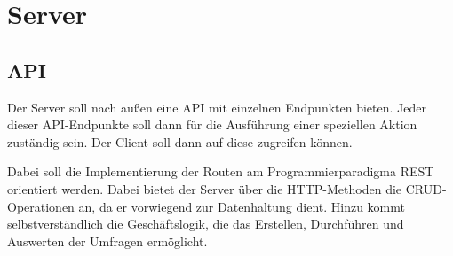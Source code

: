 \section{Server}


\subsection{\acl{API}}
Der Server soll nach außen eine \acs{API} mit einzelnen Endpunkten bieten.
Jeder dieser \acs{API}-Endpunkte soll dann für die Ausführung einer speziellen Aktion zuständig sein.
Der Client soll dann auf diese zugreifen können.

Dabei soll die Implementierung der Routen am Programmierparadigma \acs{REST} orientiert werden.
Dabei bietet der Server über die \acs{HTTP}-Methoden die \acs{CRUD}-Operationen an, da er vorwiegend zur Datenhaltung dient.
Hinzu kommt selbstverständlich die Geschäftslogik, die das Erstellen, Durchführen und Auswerten der Umfragen ermöglicht.




